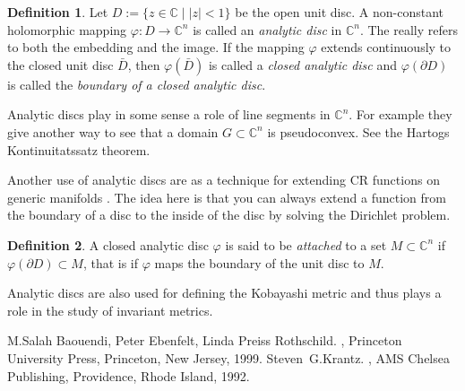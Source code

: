 \documentclass[12pt]{article}
\theoremstyle{theorem}
\theoremstyle{definition}
\newtheorem*{defn}{Definition}
\begin{document}
\begin{defn}
Let $D := \{ z \in {\mathbb{C}} \mid \lvert z \rvert < 1 \}$ be the
open unit disc.  A non-constant holomorphic mapping $\varphi \colon D \to
{\mathbb{C}}^n$ is called an {\em analytic disc} in ${\mathbb{C}}^n$.  The
 really refers to both the embedding and the image.
If the mapping $\varphi$ extends continuously to the closed unit disc
$\bar{D}$, then $\varphi(\bar{D})$ is called a {\em closed analytic disc}
and $\varphi(\partial D)$ is called the {\em boundary of a closed analytic
disc}.
\end{defn}

Analytic discs play in some sense a role of line segments in ${\mathbb{C}}^n$.
For example they give another way to see that a domain
$G \subset {\mathbb{C}}^n$ is pseudoconvex.  See the Hartogs Kontinuitatssatz
theorem.

Another use of analytic discs are as a technique for extending CR functions on generic manifolds \cite{ber:submanifold}.  The idea here is that you can always extend a function from the boundary of a disc to the inside of the disc by solving the Dirichlet problem.

\begin{defn}
A closed analytic disc $\varphi$ is said to be {\em attached}
to a set $M \subset
{\mathbb{C}}^n$ if $\varphi(\partial D) \subset M$, that is if $\varphi$
maps the boundary of the unit disc to $M$.
\end{defn}

Analytic discs are also used for defining the Kobayashi metric and thus plays a role in the study of invariant metrics.

\begin{thebibliography}{9}
M.\@ Salah Baouendi,
Peter Ebenfelt,
Linda Preiss Rothschild.
{\em {}},
Princeton University Press,
Princeton, New Jersey, 1999.
Steven~G.\@ Krantz.
{\em {}},
AMS Chelsea Publishing, Providence, Rhode Island, 1992.
\end{thebibliography}
\end{document}
